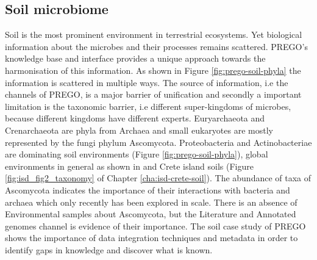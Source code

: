    \subsection{Soil microbiome}
   \label{subsec:prego-soil}

Soil is the most prominent environment in terrestrial ecosystems. Yet 
biological information about the microbes and their processes remains 
scattered. PREGO's knowledge base and interface provides a unique 
approach towards the harmonisation of this information. As shown 
in Figure \ref{fig:prego-soil-phyla} the information is scattered in multiple ways.
The source of information, i.e the channels of PREGO, is a major barrier of unification and
secondly a important limitation is the taxonomic barrier, i.e
different super-kingdoms of microbes, because different kingdoms have different experts.
Euryarchaeota and Crenarchaeota are phyla from
Archaea and 
small eukaryotes are mostly represented by the fungi phylum Ascomycota. Proteobacteria
and Actinobacteriae are dominating soil environments (Figure \ref{fig:prego-soil-phyla}),
global environments in general as shown in \textcite{microorganisms10020293} 
and Crete island soils (Figure \ref{fig:isd_fig2_taxonomy} of Chapter \ref{cha:isd-crete-soil}).
The abundance of taxa of Ascomycota indicates the importance of their interactions 
with bacteria and archaea which only recently has been explored \parencite{Labouyrie2023} in scale. 
There is an absence of Environmental samples about Ascomycota, but the Literature and Annotated genomes 
channel is evidence of their importance.
The soil case study of PREGO shows the importance of data integration techniques
and metadata in order to identify gaps in knowledge and discover what is known.


